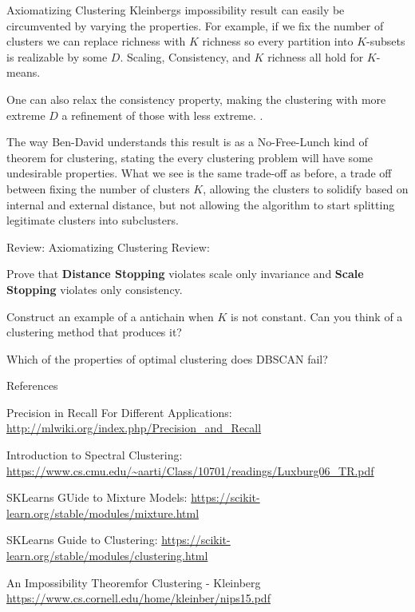 \documentclass[10pt, table, dvipsnames,xcdraw,handout]{beamer}
\begin{document}
\begin{frame}[fragile]{Axiomatizing Clustering}
Kleinbergs impossibility result can easily be circumvented by varying the properties. For example, if we fix the number of clusters we can replace richness with $K$ richness so every partition into $K$-subsets is realizable by some $D$. Scaling, Consistency, and $K$ richness all hold for $K$-means. \pause

One can also relax the consistency property, making the clustering with more extreme $D$ a refinement of those with less extreme. \pause.

The way Ben-David understands this result is as a No-Free-Lunch kind of theorem for clustering, stating the every clustering problem will have some undesirable properties. \pause What we see is the same trade-off as before, a trade off between fixing the number of clusters $K$, allowing the clusters to solidify based on internal and external distance, but not allowing the algorithm to start splitting legitimate clusters into subclusters. 
\end{frame}




\begin{frame}[fragile]{Review: Axiomatizing Clustering}
Review:

Prove that \textbf{Distance Stopping} violates scale only invariance and \textbf{Scale Stopping} violates only consistency.

Construct an example of a antichain when $K$ is not constant. Can you think of a clustering method that produces it?

Which of the properties of optimal clustering does DBSCAN fail?
\end{frame}









\begin{frame}[fragile]{References}

Precision in Recall For Different Applications:
\url{http://mlwiki.org/index.php/Precision_and_Recall}

Introduction to Spectral Clustering:
\url{https://www.cs.cmu.edu/~aarti/Class/10701/readings/Luxburg06_TR.pdf}

SKLearns GUide to Mixture Models:
\url{https://scikit-learn.org/stable/modules/mixture.html}

SKLearns Guide to Clustering:
\url{https://scikit-learn.org/stable/modules/clustering.html}

An Impossibility Theoremfor Clustering - Kleinberg
\url{https://www.cs.cornell.edu/home/kleinber/nips15.pdf}
\end{frame}
\end{document}
